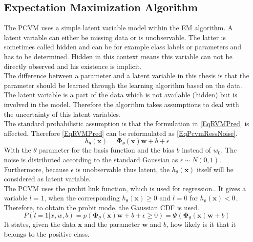 \subsection{Expectation Maximization Algorithm}\label{PcSecEM}
The \acs{PCVM} uses a simple latent variable model within the \acs{EM} algorithm.\cite{Chen.2009}
A latent variable can either be missing data or is unobservable.\cite[p. 276-277]{TrevorHastie.2009}
The latter is sometimes called hidden and can be for example class labels or parameters and has to be determined.\cite[p. 84]{Bishop.2009}
Hidden in this context means this variable can not be directly observed and his existence is implicit.\cite{Borsboom.}\\
The difference between a parameter and a latent variable in this thesis is that the parameter should be learned through the learning algorithm based on the data.
The latent variable is a part of the data which is not available (hidden) but is involved in the model.
Therefore the algorithm takes assumptions to deal with the uncertainty of this latent variables.\\
The standard probabilistic assumption is that the formulation in \eqref{EqRVMPred} is affected.
Therefore \eqref{EqRVMPred} can be reformulated as \eqref{EqPcvmRessNoise}.\cite{Chen.2009}
\begin{equation}\label{EqPcvmRessNoise}
	h_\theta (\mathbf{x}) = \boldsymbol{\Phi}_\theta(\mathbf{x}) \mathbf{w} + b +  \epsilon
\end{equation} 
With the $\theta$ parameter for the basis function and the bias $b$ instead of $w_0$.
The noise is distributed according to the standard Gaussian as $\epsilon \sim N(0,1)$.
Furthermore, because $\epsilon$ is unobservable thus latent, the $h_\theta(\mathbf{x})$ itself will be considered as latent variable.\cite{Chen.2009}\\
The \acs{PCVM} uses the probit link function, which is used for regression.\cite{Albert.1993}. It gives a variable $l = 1$, when the corresponding $h_\theta (\mathbf{x}) \ge 0$ and $l = 0$ for $h_\theta (\mathbf{x}) < 0$.\cite{Chen.2009}.
Therefore, to obtain the probit mode, the Gaussian \acs{CDF} is used.
\begin{equation}\label{EqProbitLinkProb}
	P(l=1\vert x,w,b) = p(\boldsymbol{\Phi}_\theta(\mathbf{x})\mathbf{w} + b + \epsilon \ge 0) = \Psi(\boldsymbol{\Phi}_\theta(\mathbf{x})\mathbf{w} +b)
\end{equation}
It states, given the data $\mathbf{x}$ and the parameter $\mathbf{w}$ and $b$, how likely is it that it belongs to the positive class.
